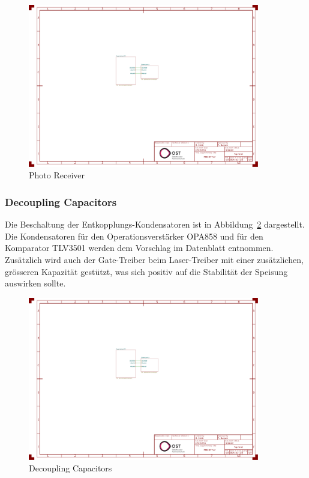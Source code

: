 \begin{figure}[H]
    \centering
    \includegraphics[page=3, trim=100 240 600 340, clip, width=0.9\textwidth]{attachments/schematic.pdf}
    \caption{Photo Receiver}\label{fig:photo_receiver}
\end{figure}

\subsubsection{Decoupling Capacitors}

Die Beschaltung der Entkopplungs-Kondensatoren ist in Abbildung~\ref{fig:decoupling_capacitors} dargestellt. Die
Kondensatoren für den Operationsverstärker OPA858 und für den Komparator TLV3501 werden dem Vorschlag im Datenblatt
entnommen. Zusätzlich wird auch der Gate-Treiber beim Laser-Treiber mit einer zusätzlichen, grösseren Kapazität gestützt,
was sich positiv auf die Stabilität der Speisung auswirken sollte.

\begin{figure}[H]
    \centering
    \includegraphics[page=3, trim=100 60 650 630, clip, width=0.9\textwidth]{attachments/schematic.pdf}
    \caption{Decoupling Capacitors}\label{fig:decoupling_capacitors}
\end{figure}


